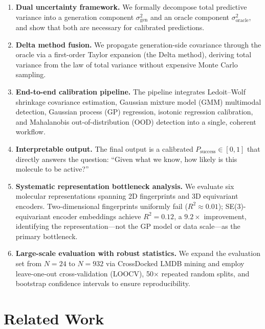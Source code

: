 \documentclass{article}
\newcommand{\Psuccess}{P_{\mathrm{success}}}
\newcommand{\Ugen}{\sigma^{2}_{\mathrm{gen}}}
\newcommand{\Uoracle}{\sigma^{2}_{\mathrm{oracle}}}
\begin{document}
\begin{enumerate}[leftmargin=2em,itemsep=2pt]
\item \textbf{Dual uncertainty framework.}  We formally decompose total
  predictive variance into a generation component $\Ugen$ and an oracle
  component $\Uoracle$, and show that both are necessary for calibrated
  predictions.

\item \textbf{Delta method fusion.}  We propagate generation-side
  covariance through the oracle via a first-order Taylor expansion
  (the Delta method), deriving total variance from the law of total
  variance without expensive Monte Carlo sampling.

\item \textbf{End-to-end calibration pipeline.}  The pipeline integrates
  Ledoit--Wolf shrinkage covariance estimation, Gaussian mixture model
  (GMM) multimodal detection, Gaussian process (GP) regression, isotonic
  regression calibration, and Mahalanobis out-of-distribution (OOD)
  detection into a single, coherent workflow.

\item \textbf{Interpretable output.}  The final output is a calibrated
  $\Psuccess \in [0,1]$ that directly answers the question: ``Given what
  we know, how likely is this molecule to be active?''

\item \textbf{Systematic representation bottleneck analysis.}  We
  evaluate six molecular representations spanning 2D fingerprints and 3D
  equivariant encoders.  Two-dimensional fingerprints uniformly fail
  ($R^{2}\!\approx\!0.01$); SE(3)-equivariant encoder embeddings achieve
  $R^{2}\!=\!0.12$, a $9.2\times$ improvement, identifying the
  representation---not the GP model or data scale---as the primary
  bottleneck.

\item \textbf{Large-scale evaluation with robust statistics.}  We expand
  the evaluation set from $N\!=\!24$ to $N\!=\!932$ via CrossDocked LMDB
  mining and employ leave-one-out cross-validation (LOOCV), 50$\times$
  repeated random splits, and bootstrap confidence intervals to ensure
  reproducibility.
\end{enumerate}


\section{Related Work}
\end{document}
